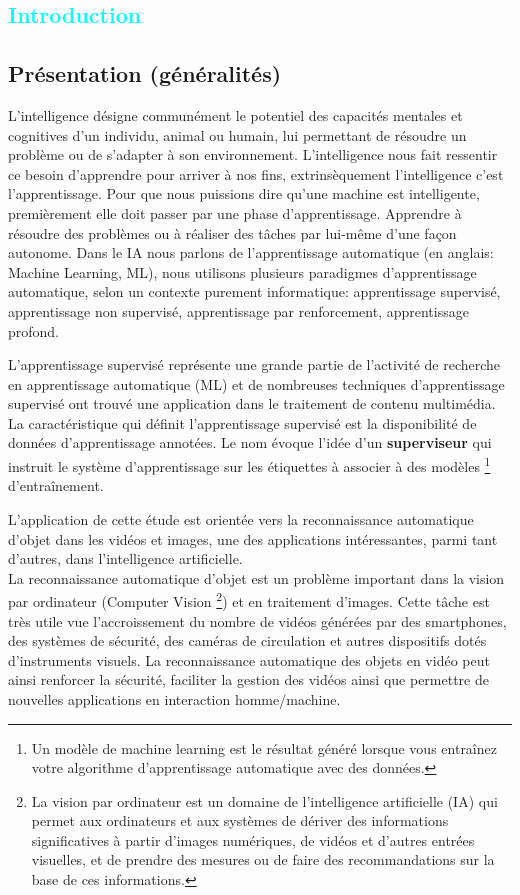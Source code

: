 

\textcolor{cyan}{\chapter{Introduction}}
	\section{Présentation (généralités)}
	
		L’intelligence désigne communément le potentiel des capacités mentales et cognitives d'un individu, animal ou humain, lui permettant de résoudre un problème ou de s'adapter à son environnement. L'intelligence nous fait ressentir ce besoin d’apprendre pour arriver à nos fins, extrinsèquement l'intelligence c’est l'apprentissage. Pour que nous puissions dire qu’une machine est intelligente, premièrement elle doit passer par une phase d'apprentissage.  Apprendre à résoudre des problèmes ou à réaliser des tâches par lui-même d’une façon autonome. Dans le IA nous parlons de l’apprentissage automatique (en anglais: Machine Learning, ML), nous utilisons plusieurs paradigmes d’apprentissage automatique, selon un contexte purement informatique:  apprentissage supervisé, apprentissage non supervisé, apprentissage par renforcement, apprentissage profond.
	
		L'apprentissage supervisé représente une grande partie de l'activité de recherche en apprentissage automatique (ML) et de nombreuses techniques d'apprentissage supervisé ont trouvé une application dans le traitement de contenu multimédia. La caractéristique qui définit l'apprentissage supervisé est la disponibilité de données d'apprentissage annotées\cite{cunningham2008supervised}. Le nom évoque l'idée d'un \textbf{superviseur} qui instruit le système d'apprentissage sur les étiquettes à associer à des modèles \footnote{Un modèle de machine learning est le résultat généré lorsque vous entraînez votre algorithme d'apprentissage automatique avec des données.} d'entraînement. 
		
		L’application de cette étude est orientée vers la reconnaissance automatique d'objet dans les vidéos et images, une des applications intéressantes, parmi tant d'autres, dans l'intelligence artificielle.\\
		La reconnaissance automatique d'objet est un problème important dans la vision par ordinateur (Computer Vision 
			\footnote{La vision par ordinateur est un domaine de l'intelligence artificielle (IA) qui permet aux ordinateurs et aux systèmes de dériver des informations significatives à partir d'images numériques, de vidéos et d'autres entrées visuelles, et de prendre des mesures ou de faire des recommandations sur la base de ces informations.}) 
		et en traitement d'images. Cette tâche est très utile vue l'accroissement du nombre de vidéos générées par des smartphones, des systèmes de sécurité, des caméras de circulation et autres dispositifs dotés d'instruments visuels. La reconnaissance automatique des objets en vidéo peut ainsi renforcer la sécurité, faciliter la gestion des vidéos ainsi que permettre de nouvelles applications en interaction homme/machine.	
			
